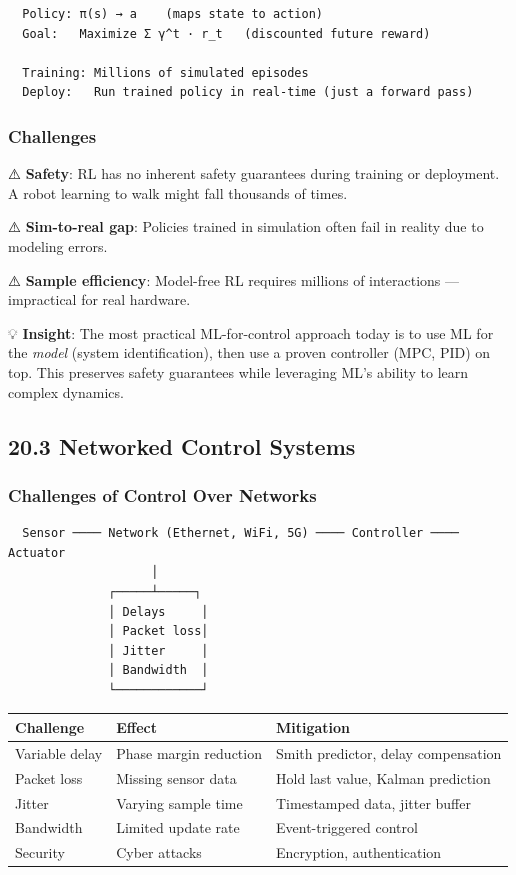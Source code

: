\documentclass[11pt,a4paper]{book}
\begin{document}
\begin{itemize}
\begin{lstlisting}
  Policy: π(s) → a    (maps state to action)
  Goal:   Maximize Σ γ^t · r_t   (discounted future reward)
  
  Training: Millions of simulated episodes
  Deploy:   Run trained policy in real-time (just a forward pass)
\end{lstlisting}

\subsubsection{Challenges}

⚠️ \textbf{Safety}: RL has no inherent safety guarantees during training or deployment. A robot learning to walk might fall thousands of times.

⚠️ \textbf{Sim-to-real gap}: Policies trained in simulation often fail in reality due to modeling errors.

⚠️ \textbf{Sample efficiency}: Model-free RL requires millions of interactions — impractical for real hardware.

💡 \textbf{Insight}: The most practical ML-for-control approach today is to use ML for the \textit{model} (system identification), then use a proven controller (MPC, PID) on top. This preserves safety guarantees while leveraging ML's ability to learn complex dynamics.

\medskip\noindent\hrulefill\medskip

\subsection{20.3 Networked Control Systems}

\subsubsection{Challenges of Control Over Networks}

\begin{lstlisting}
  Sensor ──── Network (Ethernet, WiFi, 5G) ──── Controller ──── Actuator
                    │
              ┌─────┴─────┐
              │ Delays     │
              │ Packet loss│
              │ Jitter     │
              │ Bandwidth  │
              └────────────┘
\end{lstlisting}

\begin{center}
\begin{tabular}{|l|l|l|}
\hline
Challenge & Effect & Mitigation \\
\hline
Variable delay & Phase margin reduction & Smith predictor, delay compensation \\
Packet loss & Missing sensor data & Hold last value, Kalman prediction \\
Jitter & Varying sample time & Timestamped data, jitter buffer \\
Bandwidth & Limited update rate & Event-triggered control \\
Security & Cyber attacks & Encryption, authentication \\
\hline
\end{tabular}
\end{center}


\end{itemize}
\end{document}
